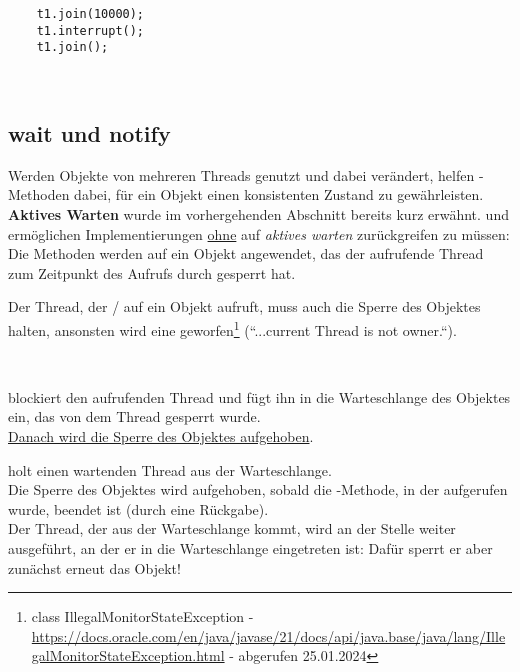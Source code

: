 \begin{verbatim}
    t1.join(10000);
    t1.interrupt();
    t1.join();
\end{verbatim}\\


\subsection{wait und notify}

Werden Objekte von mehreren Threads genutzt und dabei verändert, helfen -Methoden dabei, für ein Objekt einen konsistenten Zustand zu gewährleisten.\\

\noindent
\textbf{Aktives Warten} wurde im vorhergehenden Abschnitt bereits kurz erwähnt.
 und  ermöglichen Implementierungen \ul{ohne} auf \textit{aktives warten} zurückgreifen zu müssen: Die Methoden werden auf ein Objekt angewendet, das der aufrufende Thread zum Zeitpunkt des Aufrufs durch  gesperrt hat.

\begin{tcolorbox}
    Der Thread, der  /  auf ein Objekt aufruft, muss auch die Sperre des Objektes halten, ansonsten wird eine  geworfen\footnote{
    class IllegalMonitorStateException - \url{https://docs.oracle.com/en/java/javase/21/docs/api/java.base/java/lang/IllegalMonitorStateException.html} - abgerufen 25.01.2024
    } (``...current Thread is not owner.``).
\end{tcolorbox}\\

\begin{center}
\end{center}
\noindent
blockiert den aufrufenden Thread und fügt ihn in die Warteschlange des Objektes ein, das von dem Thread gesperrt wurde.\\
\ul{Danach wird die Sperre des Objektes aufgehoben}.

\begin{center}
\end{center}
\noindent
holt einen wartenden Thread aus der Warteschlange.\\
Die Sperre des Objektes wird aufgehoben, sobald die -Methode, in der  aufgerufen wurde, beendet ist (durch eine Rückgabe).\\
Der Thread, der aus der Warteschlange kommt, wird an der Stelle weiter ausgeführt, an der er in die Warteschlange eingetreten ist: Dafür sperrt er aber zunächst erneut das Objekt!

